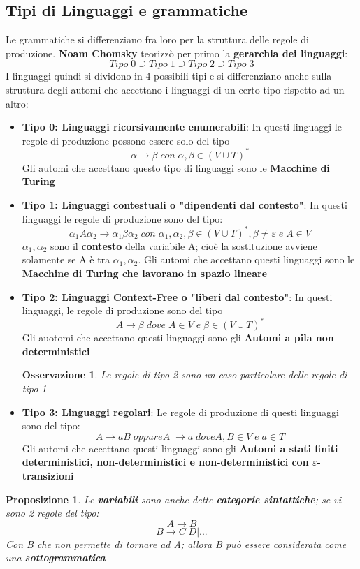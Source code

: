\documentclass[12pt]{article}
\newtheorem{Proposizione}{Proposizione}[subsection]
\newtheorem{Osservazione}{Osservazione}[subsection]
\begin{document}
\subsection{Tipi di Linguaggi e grammatiche}
Le grammatiche si differenziano fra loro per la struttura delle regole di produzione. \textbf{Noam Chomsky} teorizzò per primo la \textbf{gerarchia dei linguaggi}:
$$Tipo \; 0 \supseteq Tipo \; 1 \supseteq Tipo \; 2 \supseteq Tipo \; 3$$
I linguaggi quindi si dividono in 4 possibili tipi e si differenziano anche sulla struttura degli automi che accettano i linguaggi di un certo tipo rispetto ad un altro:
\begin{itemize}
    \item \textbf{Tipo 0: Linguaggi ricorsivamente enumerabili}: In questi linguaggi le regole di produzione possono essere solo del tipo $$\alpha \rightarrow \beta \; con \; \alpha, \beta \in (V \cup T)^*$$
    Gli automi che accettano questo tipo di linguaggi sono le \textbf{Macchine di Turing}
    \item \textbf{Tipo 1: Linguaggi contestuali o "dipendenti dal contesto"}: In questi linguaggi le regole di produzione sono del tipo: $$\alpha_1 A \alpha_2 \rightarrow \alpha_1 \beta \alpha_2 \; con \; \alpha_1,\alpha_2,\beta \in (V \cup T)^*, \beta \neq \varepsilon \; e \; A \in V$$
    $\alpha_1, \alpha_2$ sono il \textbf{contesto} della variabile A; cioè la sostituzione avviene solamente se A è tra $\alpha_1, \alpha_2$. Gli automi che accettano questi linguaggi sono le \textbf{Macchine di Turing che lavorano in spazio lineare}
    \item \textbf{Tipo 2: Linguaggi Context-Free o "liberi dal contesto"}: In questi linguaggi, le regole di produzione sono del tipo $$A \rightarrow \beta \; dove \; A \in V \; e \; \beta \in (V \cup T)^*$$
    Gli auotomi che accettano questi linguaggi sono gli \textbf{Automi a pila non deterministici}
    \begin{Osservazione}
        Le regole di tipo 2 sono un caso particolare delle regole di tipo 1
    \end{Osservazione}
    \item \textbf{Tipo 3: Linguaggi regolari}: Le regole di produzione di questi linguaggi sono del tipo:
    $$A \rightarrow aB \; oppure A \; \rightarrow a \; dove A,B \in V \; e \; a \in T$$
    Gli automi che accettano questi linguaggi sono gli \textbf{Automi a stati finiti deterministici, non-deterministici e non-deterministici con $\varepsilon$-transizioni}
\end{itemize}
\begin{Proposizione}
Le \textbf{variabili} sono anche dette \textbf{categorie sintattiche}; se vi sono 2 regole del tipo: $$A \to B$$ $$B \to C | D |...$$
Con B che non permette di tornare ad A; allora B può essere considerata come una \textbf{sottogrammatica}
\end{Proposizione}
\end{document}
